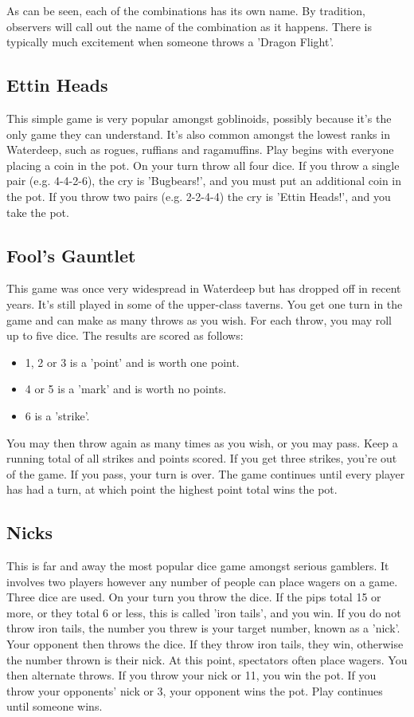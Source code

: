 \documentclass[10pt,a4paper,twoside,twocolumn,openany,bg=print,nodeprecatedcode]{dndbook}
\begin{document}
As can be seen, each of the combinations has its own name. By tradition, observers will call out the name of the combination as it happens. There is typically much excitement when someone throws a 'Dragon Flight'.
\subsection{Ettin Heads}
This simple game is very popular amongst goblinoids, possibly because it's the only game they can understand. It's also common amongst the lowest ranks in Waterdeep, such as rogues, ruffians and ragamuffins.
Play begins with everyone placing a coin in the pot. On your turn throw all four dice. If you throw a single pair (e.g. 4-4-2-6), the cry is 'Bugbears!', and you must put an additional coin in the pot. If you throw two pairs (e.g. 2-2-4-4) the cry is 'Ettin Heads!', and you take the pot.
\subsection{Fool's Gauntlet}
This game was once very widespread in Waterdeep but has dropped off in recent years. It's still played in some of the upper-class taverns.
You get one turn in the game and can make as many throws as you wish. For each throw, you may roll up to five dice. The results are scored as follows:

\begin{itemize}
\item 1, 2 or 3 is a 'point' and is worth one point.
\item 4 or 5 is a 'mark' and is worth no points.
\item 6 is a 'strike'.
\end{itemize}

You may then throw again as many times as you wish, or you may pass. Keep a running total of all strikes and points scored. If you get three strikes, you're out of the game. If you pass, your turn is over.
The game continues until every player has had a turn, at which point the highest point total wins the pot.
\subsection{Nicks}
This is far and away the most popular dice game amongst serious gamblers. It involves two players however any number of people can place wagers on a game. Three dice are used.
On your turn you throw the dice. If the pips total 15 or more, or they total 6 or less, this is called 'iron tails', and you win. If you do not throw iron tails, the number you threw is your target number, known as a 'nick'.
Your opponent then throws the dice. If they throw iron tails, they win, otherwise the number thrown is their nick. At this point, spectators often place wagers.
You then alternate throws. If you throw your nick or 11, you win the pot. If you throw your opponents' nick or 3, your opponent wins the pot. Play continues until someone wins.
\end{document}
